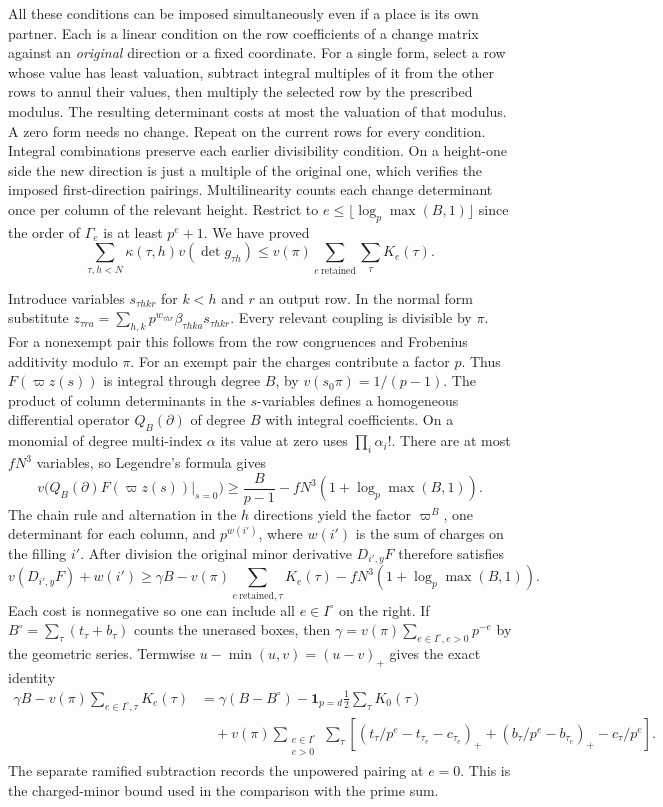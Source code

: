 All these conditions can be imposed simultaneously even if a place is its own partner. Each is a linear condition on the row coefficients of a change matrix against an \emph{original} direction or a fixed coordinate. For a single form, select a row whose value has least valuation, subtract integral multiples of it from the other rows to annul their values, then multiply the selected row by the prescribed modulus. The resulting determinant costs at most the valuation of that modulus. A zero form needs no change. Repeat on the current rows for every condition. Integral combinations preserve each earlier divisibility condition. On a height-one side the new direction is just a multiple of the original one, which verifies the imposed first-direction pairings. Multilinearity counts each change determinant once per column of the relevant height. Restrict to $e\le\lfloor\log_p\max(B,1)\rfloor$ since the order of $\Gamma_e$ is at least $p^e+1$. We have proved
\[
 \sum_{\tau,h<N}\kappa(\tau,h)v(\det g_{\tau h})
 \le v(\pi)\sum_{e\ \mathrm{retained}}\sum_\tau K_e(\tau).
\]

Introduce variables $s_{\tau h k r}$ for $k<h$ and $r$ an output row.
In the normal form substitute $z_{\tau r a}=\sum_{h,k}p^{w_{\tau h r}}
\beta_{\tau h k a}s_{\tau h k r}$. Every relevant coupling is divisible by $\pi$.
For a nonexempt pair this follows from the row congruences and Frobenius additivity modulo $\pi$. For an exempt pair the charges contribute a factor $p$. Thus $F(\varpi z(s))$ is integral through degree $B$, by $v(s_0\pi)=1/(p-1)$. The product of column determinants in the $s$-variables defines a homogeneous differential operator $Q_B(\partial)$ of degree $B$ with integral coefficients. On a monomial of degree multi-index $\alpha$ its value at zero uses $\prod_i\alpha_i!$. There are at most $fN^3$ variables, so Legendre's formula gives
\[
 v\big(Q_B(\partial)F(\varpi z(s))|_{s=0}\big)
 \ge \frac{B}{p-1}-fN^3(1+\log_p\max(B,1)).
\]
The chain rule and alternation in the $h$ directions yield the factor $\varpi^B$, one determinant for each column, and $p^{w(i')}$, where $w(i')$ is the sum of charges on the filling $i'$. After division the original minor derivative $D_{i',y}F$ therefore satisfies
\[
 v(D_{i',y}F)+w(i')\ge
 \gamma B-v(\pi)\sum_{e\ \mathrm{retained},\tau}K_e(\tau)
       -fN^3(1+\log_p\max(B,1)).
\]
Each cost is nonnegative so one can include all $e\in I^\circ$ on the right. If $B^\circ=\sum_\tau(t_\tau+b_\tau)$ counts the unerased boxes, then
$\gamma=v(\pi)\sum_{e\in I^\circ,e>0}p^{-e}$ by the geometric series.
Termwise $u-\min(u,v)=(u-v)_+$ gives the exact identity
\begin{align*}
 \gamma B-v(\pi)\sum_{e\in I^\circ,\tau}K_e(\tau)
 &=\gamma(B-B^\circ)-\mathbf1_{p=d}\tfrac12\sum_\tau K_0(\tau)\\
 &\quad+v(\pi)\sum_{\substack{e\in I^\circ\\e>0}}\sum_\tau
 \left[(t_\tau/p^e-t_{\tau_e}-c_{\tau_e})_+
 +(b_\tau/p^e-b_{\tau_e})_+-c_\tau/p^e\right].
\end{align*}
The separate ramified subtraction records the unpowered pairing at $e=0$.
This is the charged-minor bound used in the comparison with the prime sum.

